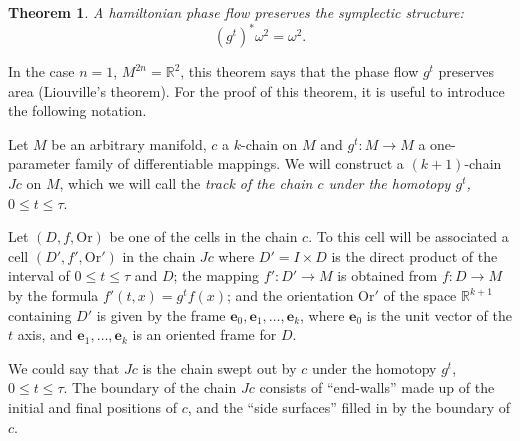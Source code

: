 \documentclass{book}
\numberwithin{equation}{section}
\theoremstyle{plain}
\newtheorem{thm}{Theorem}[section]
\theoremstyle{definition}
\theoremstyle{remark}
\theoremstyle{remark}
\begin{document}
\begin{thm}
A hamiltonian phase flow preserves the symplectic structure:
$$
(g^t)^* \omega^2 = \omega^2.
$$
\end{thm}



In the case $n = 1$, $M^{2n} = \mathbb{R}^2$, this theorem says
that the phase flow $g^t$ preserves area (Liouville's theorem).
%
For the proof of this theorem, it is useful to introduce
the following notation.

Let $M$ be an arbitrary manifold,
$c$ a $k$-chain on $M$ and $g^t: M \rightarrow M$
a one-parameter family of differentiable mappings.
We will construct a $(k+1)$-chain $Jc$ on $M$,
which we will call the
\emph{track of the chain $c$ under the homotopy
$g^t$, $0 \le t \le \tau$}.


Let $(D, f, \mathrm{Or})$ be one of the cells in the chain $c$.
%
To this cell will be associated a cell $(D', f', \mathrm{Or}')$
  in the chain $Jc$ where $D' = I\times D$ is the direct product
  of the interval of $0 \le t \le \tau$ and $D$;
  the mapping $f': D' \rightarrow M$ is obtained from
  $f: D \rightarrow M$ by the formula
  $f'(t, x) = g^t f(x)$;
  and the orientation $\mathrm{Or}'$ of the space $\mathbb{R}^{k+1}$
  containing $D'$ is given by the frame
  $\mathbf e_0, \mathbf e_1, \dots, \mathbf e_k$,
  where $\mathbf e_0$ is the unit vector of the $t$ axis,
  and $\mathbf e_1, \dots, \mathbf e_k$ is an oriented frame for $D$.


We could say that $Jc$ is the chain swept out by $c$
  under the homotopy $g^t$, $0 \le t \le \tau$.
  The boundary of the chain $Jc$ consists of ``end-walls''
  made up of the initial and final positions of $c$, 
  and the ``side surfaces'' filled in by the boundary of $c$.

\end{document}
